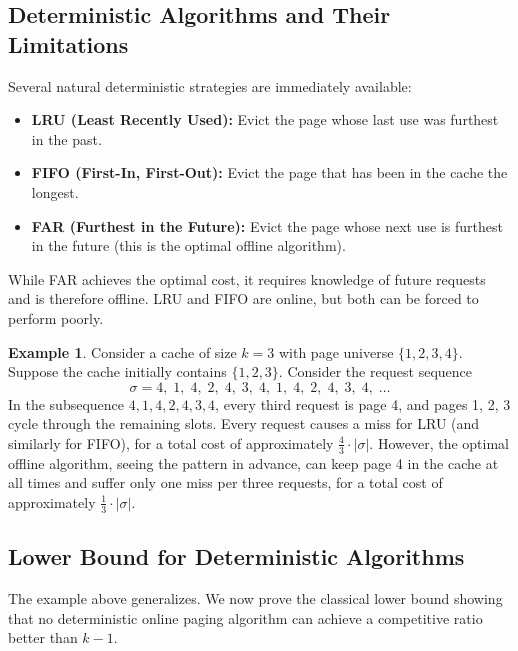 \documentclass[twoside,12pt]{book}
\theoremstyle{plain}
\theoremstyle{definition}
\newtheorem{example}[theorem]{Example}
\theoremstyle{remark}
\begin{document}
\subsection{Deterministic Algorithms and Their Limitations}

Several natural deterministic strategies are immediately
available:

\begin{itemize}[nosep]
  \item \textbf{LRU (Least Recently Used):} Evict the page whose last
        use was furthest in the past.
  \item \textbf{FIFO (First-In, First-Out):} Evict the page that has
        been in the cache the longest.
  \item \textbf{FAR (Furthest in the Future):} Evict the page whose next
        use is furthest in the future (this is the optimal offline
        algorithm).
\end{itemize}

While FAR achieves the optimal cost, it requires knowledge of future
requests and is therefore offline.  LRU and FIFO are online, but both
can be forced to perform poorly.

\begin{example}\label{ex:paging-adversary}
Consider a cache of size $k=3$ with page universe $\{1, 2, 3, 4\}$.
Suppose the cache initially contains $\{1, 2, 3\}$.  Consider the
request sequence
\[
  \sigma = 4,\; 1,\; 4,\; 2,\; 4,\; 3,\; 4,\; 1,\; 4,\; 2,\; 4,\; 3,\; 4,\; \ldots
\]
In the subsequence $4, 1, 4, 2, 4, 3, 4$, every third request is page 4,
and pages 1, 2, 3 cycle through the remaining slots.  Every request
causes a miss for LRU (and similarly for FIFO), for a total cost of
approximately $\tfrac{4}{3} \cdot |\sigma|$.  However, the optimal
offline algorithm, seeing the pattern in advance, can keep page 4 in the
cache at all times and suffer only one miss per three requests, for a
total cost of approximately $\tfrac{1}{3} \cdot |\sigma|$.
\end{example}

\subsection{Lower Bound for Deterministic Algorithms}

The example above generalizes.  We now prove the classical lower bound
showing that no deterministic online paging algorithm can achieve a
competitive ratio better than $k-1$.
\end{document}

